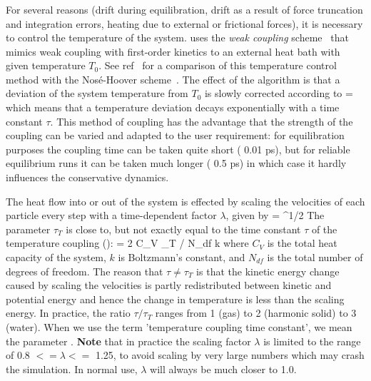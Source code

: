 \subsubsection{}
For several reasons (drift during equilibration, drift as a result of
force truncation and integration errors, heating due to external or
frictional forces), it is necessary to control the temperature of the
system. {\gromacs} uses the {\em weak coupling} scheme~\cite{Berendsen84}
that mimics weak coupling with first-order kinetics to an external
heat bath with given temperature $T_0$. See ref~\cite{Berendsen91} for
a comparison of this temperature control method with the
Nos{\'e}-Hoover scheme~\cite{Nose84,Hoover85}. The effect of the algorithm is
that a deviation of the system temperature from $T_0$ is slowly
corrected according to
\beq
{} = 
\label{eqn:Tcoupling}
\eeq
which means that a temperature deviation decays exponentially with a
time constant $\tau$.
This method of coupling has the advantage that the strength of the
coupling can be varied and adapted to the user requirement: for
equilibration purposes the coupling time can be taken quite short
({\eg} 0.01 ps), but for reliable equilibrium runs it can be taken much
longer ({\eg} 0.5 ps) in which case it hardly influences the
conservative dynamics.
 
The heat flow into or out of the system is effected by scaling the
velocities of each particle every step with a time-dependent factor
$\lambda$, given by
\beq 
\lambda = ^{1/2}
\label{eqn:lambda}
\eeq
The parameter $\tau_T$ is close to, but not exactly equal to the time constant
$\tau$ of the temperature coupling ():
\beq
\tau = 2 C_V \tau_T / N_{df} k
\eeq
where $C_V$ is the total heat capacity of the system, $k$ is Boltzmann's
constant, and $N_{df}$ is the total number of degrees of freedom. The
reason that $\tau \neq \tau_T$ is that the kinetic energy change
caused by scaling the velocities is partly redistributed between
kinetic and potential energy and hence the change in temperature is
less than the scaling energy.  In practice, the ratio $\tau / \tau_T$
ranges from 1 (gas) to 2 (harmonic solid) to 3 (water). When we use
the term 'temperature coupling time constant', we mean the parameter
.  
{\bf Note} that in practice the scaling factor $\lambda$ is limited to 
the range of 0.8 $<= \lambda <=$ 1.25, to avoid scaling by very large
numbers which may crash the simulation. In normal use, 
$\lambda$ will always be much closer to 1.0.
  
